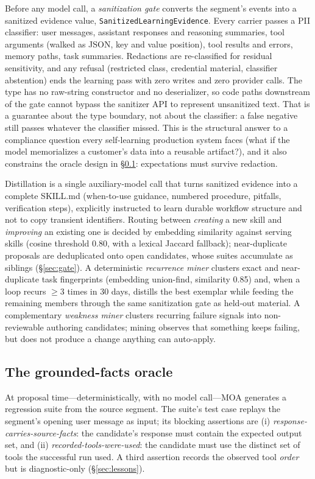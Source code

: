 \documentclass{article}
\newcommand{\moa}{MOA}
\newcommand{\code}[1]{\texttt{\small #1}}
\begin{document}
Before any model call, a \emph{sanitization gate} converts the segment's events into a sanitized evidence value, \code{SanitizedLearningEvidence}. Every carrier passes a PII classifier: user messages, assistant responses and reasoning summaries, tool arguments (walked as JSON, key and value position), tool results and errors, memory paths, task summaries. Redactions are re-classified for residual sensitivity, and any refusal (restricted class, credential material, classifier abstention) ends the learning pass with zero writes and zero provider calls. The type has no raw-string constructor and no deserializer, so code paths downstream of the gate cannot bypass the sanitizer API to represent unsanitized text. That is a guarantee about the type boundary, not about the classifier: a false negative still passes whatever the classifier missed. This is the structural answer to a compliance question every self-learning production system faces (what if the model memorializes a customer's data into a reusable artifact?), and it also constrains the oracle design in \S\ref{sec:oracle}: expectations must survive redaction.

Distillation is a single auxiliary-model call that turns sanitized evidence into a complete SKILL.md (when-to-use guidance, numbered procedure, pitfalls, verification steps), explicitly instructed to learn durable workflow structure and not to copy transient identifiers. Routing between \emph{creating} a new skill and \emph{improving} an existing one is decided by embedding similarity against serving skills (cosine threshold 0.80, with a lexical Jaccard fallback); near-duplicate proposals are deduplicated onto open candidates, whose suites accumulate as siblings (\S\ref{sec:gate}). A deterministic \emph{recurrence miner} clusters exact and near-duplicate task fingerprints (embedding union-find, similarity 0.85) and, when a loop recurs $\geq 3$ times in 30 days, distills the best exemplar while feeding the remaining members through the same sanitization gate as held-out material. A complementary \emph{weakness miner} clusters recurring failure signals into non-reviewable authoring candidates; mining observes that something keeps failing, but does not produce a change anything can auto-apply.

\subsection{The grounded-facts oracle}
\label{sec:oracle}

At proposal time---deterministically, with no model call---\moa{} generates a regression suite from the source segment. The suite's test case replays the segment's opening user message as input; its blocking assertions are (i) \emph{response-carries-source-facts}: the candidate's response must contain the expected output set, and (ii) \emph{recorded-tools-were-used}: the candidate must use the distinct set of tools the successful run used. A third assertion records the observed tool \emph{order} but is diagnostic-only (\S\ref{sec:lessons}).
\end{document}
